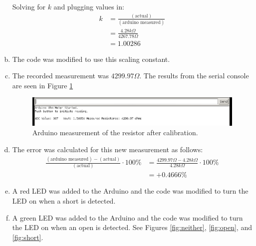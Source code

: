 \documentclass[12pt]{article}
\begin{document}
\begin{enumerate}[a.]
    Solving for $k$ and plugging values in:
    \begin{equation}
        \begin{aligned}
            k &= \frac{(\text{actual})}{(\text{arduino measured})}  \\
            &= \frac{4.28k\Omega}{4267.78\Omega}  \\
            &= \mathbf{1.00286}
        \end{aligned}
    \end{equation}

    \item The code was modified to use this scaling constant.
    \item The recorded measurement was $4299.97\Omega$.
    The results from the serial console are seen in Figure \ref{fig:meas2}

    \begin{figure}[H]
      \centering
      \includegraphics[width=\linewidth]{meas2.png}
      \caption{Arduino measurement of the resistor after calibration.}
      \label{fig:meas2}
    \end{figure}

    \item The error was calculated for this new measurement as follows:
    \begin{equation}
        \begin{aligned}
            \frac{(\text{arduino measured}) - (\text{actual})}{(\text{actual})} \cdot 100 \% 
            &= \frac{4299.97\Omega - 4.28k\Omega}{4.28k\Omega} \cdot 100\% \\
            &= \mathbf{+0.4666\%}
        \end{aligned}
    \end{equation}

    \item A red LED was added to the Arduino and the code was modified to turn the LED on when a short 
    is detected.
    \item A green LED was added to the Arduino and the code was modified to turn the LED on when 
    an open is detected. See Figures \ref{fig:neither}, \ref{fig:open}, and \ref{fig:short}.


\end{enumerate}
\end{document}
